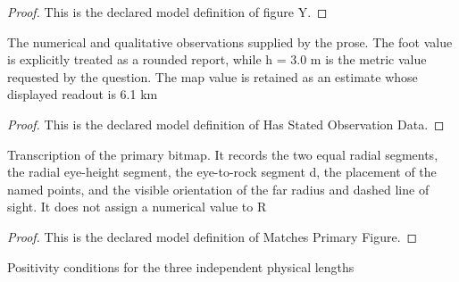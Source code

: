 \begin{proof}
  This is the declared model definition of figure Y.
\end{proof}
\begin{definition}
  \label{def:physics:phyx-mini-0726:phyxminiproblems-problemphyxmini0726-hasstatedobservationdata}
  The numerical and qualitative observations supplied by the prose. The foot value is explicitly treated as a rounded report, while h = 3.0 m is the metric value requested by the question. The map value is retained as an estimate whose displayed readout is 6.1 km
\end{definition}
\begin{proof}
  This is the declared model definition of Has Stated Observation Data.
\end{proof}
\begin{definition}
  \label{def:physics:phyx-mini-0726:phyxminiproblems-problemphyxmini0726-matchesprimaryfigure}
  Transcription of the primary bitmap. It records the two equal radial segments, the radial eye-height segment, the eye-to-rock segment d, the placement of the named points, and the visible orientation of the far radius and dashed line of sight. It does not assign a numerical value to R
\end{definition}
\begin{proof}
  This is the declared model definition of Matches Primary Figure.
\end{proof}
\begin{definition}
  \label{def:physics:phyx-mini-0726:phyxminiproblems-problemphyxmini0726-hasphysicallengths}
  Positivity conditions for the three independent physical lengths
\end{definition}
